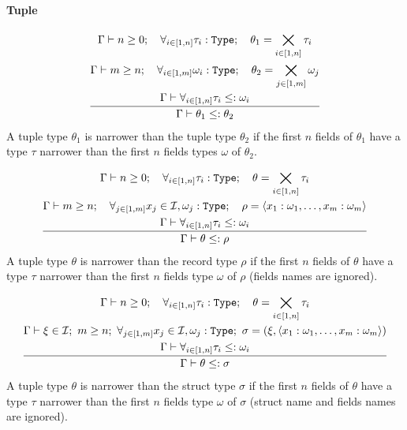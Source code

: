 \clearpage

\paragraph{Tuple}

\[
	\frac{\begin{gathered}
		\Gamma\vdash n \geq 0 ;\quad \forall_{i\in[1,n]}{\tau_i:\texttt{Type}} ;\quad \theta_1 = \bigtimes_{i \in [1,n]}{\tau_i}\\*
		\Gamma\vdash m \geq n ;\quad \forall_{i\in[1,m]}{\omega_i:\texttt{Type}} ;\quad \theta_2 = \bigtimes_{j \in [1,m]}{\omega_j}\\*
		\Gamma\vdash \forall_{i \in [1,n]}{\tau_i \leq: \omega_i}
	\end{gathered}}{\begin{gathered}
		\Gamma\vdash \theta_1 \leq: \theta_2
	\end{gathered}}
\]
A tuple type $\theta_1$ is narrower than the tuple type $\theta_2$ if the first
$n$ fields of $\theta_1$ have a type $\tau$ narrower than the first $n$ fields
types $\omega$ of $\theta_2$.

\vspace{\baselineskip}

\[
	\frac{\begin{gathered}
		\Gamma\vdash n \geq 0 ;\quad \forall_{i\in[1,n]}{\tau_i:\texttt{Type}} ;\quad \theta = \bigtimes_{i \in [1,n]}{\tau_i}\\*
		\Gamma\vdash m \geq n ;\quad \forall_{j\in[1,m]}{x_j \in \mathcal{I}, \omega_j:\texttt{Type}} ;\quad \rho = \left<x_1:\omega_1,\dotsc,x_m:\omega_m\right> \\*
		\Gamma\vdash \forall_{i \in [1,n]}{\tau_i \leq: \omega_i}
	\end{gathered}}{\begin{gathered}
		\Gamma\vdash \theta \leq: \rho
	\end{gathered}}
\]
A tuple type $\theta$ is narrower than the record type $\rho$ if the first $n$
fields of $\theta$ have a type $\tau$ narrower than the first $n$ fields type
$\omega$ of $\rho$ (fields names are ignored).

\vspace{\baselineskip}

\[
	\frac{\begin{gathered}
		\Gamma\vdash n \geq 0 ;\quad \forall_{i\in[1,n]}{\tau_i:\texttt{Type}} ;\quad \theta = \bigtimes_{i \in [1,n]}{\tau_i}\\*
		\Gamma\vdash \xi \in \mathcal{I} ;\  m \geq n ;\  \forall_{j\in[1,m]}{x_j \in \mathcal{I}, \omega_j:\texttt{Type}} ;\  \sigma = (\xi, \left<x_1:\omega_1,\dotsc,x_m:\omega_m\right>) \\*
		\Gamma\vdash \forall_{i \in [1,n]}{\tau_i \leq: \omega_i}
	\end{gathered}}{\begin{gathered}
		\Gamma\vdash \theta \leq: \sigma
	\end{gathered}}
\]
A tuple type $\theta$ is narrower than the struct type $\sigma$ if the first
$n$ fields of $\theta$ have a type $\tau$ narrower than the first $n$ fields
type $\omega$ of $\sigma$ (struct name and fields names are ignored).

